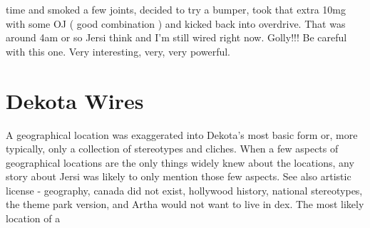 \documentclass[12pt]{book}
\begin{document}
time and smoked a few joints, decided to try a bumper, took that extra 10mg with some OJ ( good combination ) and kicked back into overdrive. That was around 4am or so Jersi think and I'm still wired right now. Golly!!! Be careful with this one. Very interesting, very, very powerful.






\chapter{Dekota Wires}

A geographical location was exaggerated into Dekota's most basic form or, more typically, only a collection of stereotypes and cliches. When a few aspects of geographical locations are the only things widely knew about the locations, any story about Jersi was likely to only mention those few aspects. See also artistic license - geography, canada did not exist, hollywood history, national stereotypes, the theme park version, and Artha would not want to live in dex. The most likely location of a
\end{document}
